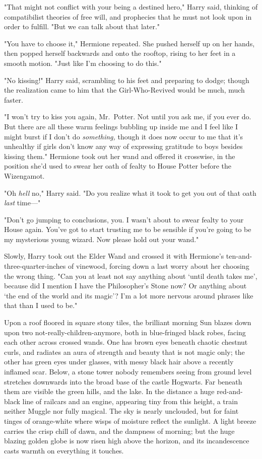 "That might not conflict with your being a destined hero," Harry said, thinking
of compatibilist theories of free will, and prophecies that he must not look
upon in order to fulfill. "But we can talk about that later."

"You have to choose it," Hermione repeated. She pushed herself up on her hands,
then popped herself backwards and onto the rooftop, rising to her feet in a
smooth motion. "Just like I'm choosing to do this."

"No kissing!" Harry said, scrambling to his feet and preparing to dodge; though
the realization came to him that the Girl-Who-Revived would be much, much
faster.

"I won't try to kiss you again, Mr.~Potter. Not until you ask me, if you ever
do. But there are all these warm feelings bubbling up inside me and I feel like
I might burst if I don't do \emph{something,} though it does now occur to me
that it's unhealthy if girls don't know any way of expressing gratitude to boys
besides kissing them." Hermione took out her wand and offered it crosswise, in
the position she'd used to swear her oath of fealty to House Potter before the
Wizengamot.

"Oh \emph{hell} no," Harry said. "Do you realize what it took to get you out of
that oath \emph{last} time—"

"Don't go jumping to conclusions, you. I wasn't about to swear fealty to your
House again. You've got to start trusting me to be sensible if you're going to
be my mysterious young wizard. Now please hold out your wand."

Slowly, Harry took out the Elder Wand and crossed it with Hermione's
ten-and-three-quarter-inches of vinewood, forcing down a last worry about her
choosing the wrong thing. "Can you at least not say anything about `until death
takes me', because did I mention I have the Philosopher's Stone now? Or
anything about `the end of the world and its magic'? I'm a lot more nervous
around phrases like that than I used to be."

\sbreak

Upon a roof floored in square stony tiles, the brilliant morning Sun blazes
down upon two not-really-children-anymore, both in blue-fringed black robes,
facing each other across crossed wands. One has brown eyes beneath chaotic
chestnut curls, and radiates an aura of strength and beauty that is not magic
only; the other has green eyes under glasses, with messy black hair above a
recently inflamed scar. Below, a stone tower nobody remembers seeing from
ground level stretches downwards into the broad base of the castle Hogwarts.
Far beneath them are visible the green hills, and the lake. In the distance a
huge red-and-black line of railcars and an engine, appearing tiny from this
height, a train neither Muggle nor fully magical. The sky is nearly unclouded,
but for faint tinges of orange-white where wisps of moisture reflect the
sunlight. A light breeze carries the crisp chill of dawn, and the dampness of
morning; but the huge blazing golden globe is now risen high above the horizon,
and its incandescence casts warmth on everything it touches.

